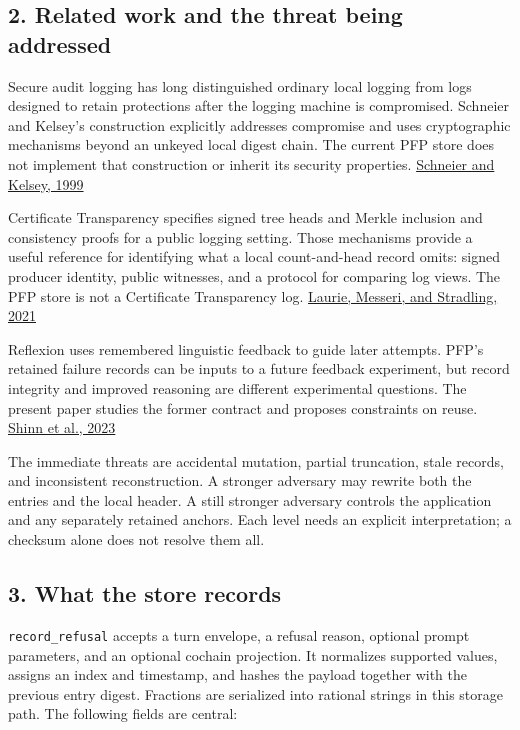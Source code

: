 \documentclass[
  11pt,
]{article}
\begin{document}
\hypertarget{related-work-and-the-threat-being-addressed}{%
\subsection{2. Related work and the threat being
addressed}\label{related-work-and-the-threat-being-addressed}}

Secure audit logging has long distinguished ordinary local logging from
logs designed to retain protections after the logging machine is
compromised. Schneier and Kelsey's construction explicitly addresses
compromise and uses cryptographic mechanisms beyond an unkeyed local
digest chain. The current PFP store does not implement that construction
or inherit its security properties.
\href{https://www.schneier.com/academic/archives/1999/05/secure_audit_logs_to.html}{Schneier
and Kelsey, 1999}

Certificate Transparency specifies signed tree heads and Merkle
inclusion and consistency proofs for a public logging setting. Those
mechanisms provide a useful reference for identifying what a local
count-and-head record omits: signed producer identity, public witnesses,
and a protocol for comparing log views. The PFP store is not a
Certificate Transparency log.
\href{https://www.rfc-editor.org/rfc/rfc9162.html}{Laurie, Messeri, and
Stradling, 2021}

Reflexion uses remembered linguistic feedback to guide later attempts.
PFP's retained failure records can be inputs to a future feedback
experiment, but record integrity and improved reasoning are different
experimental questions. The present paper studies the former contract
and proposes constraints on reuse.
\href{https://arxiv.org/abs/2303.11366v4}{Shinn et al., 2023}

The immediate threats are accidental mutation, partial truncation, stale
records, and inconsistent reconstruction. A stronger adversary may
rewrite both the entries and the local header. A still stronger
adversary controls the application and any separately retained anchors.
Each level needs an explicit interpretation; a checksum alone does not
resolve them all.

\hypertarget{what-the-store-records}{%
\subsection{3. What the store records}\label{what-the-store-records}}

\texttt{\nolinkurl{record_refusal}} accepts a turn envelope, a
refusal reason, optional prompt parameters, and an optional cochain
projection. It normalizes supported values, assigns an index and
timestamp, and hashes the payload together with the previous entry
digest. Fractions are serialized into rational strings in this storage
path. The following fields are central:
\end{document}
